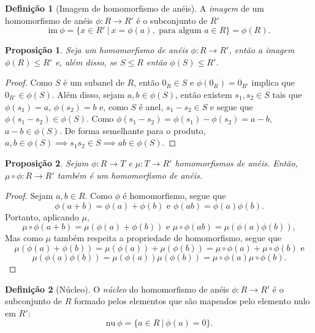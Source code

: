 \documentclass[a4paper,12pt]{report}
\theoremstyle{plain}
\newtheorem{proposicao}{Proposição}[section]
\theoremstyle{definition}
\newtheorem{definicao}{Definição}[section]
\begin{document}
\begin{definicao}[Imagem de homomorfismo de anéis]
	A \emph{imagem} de um homomorfismo de anéis
	\(\phi: R\longrightarrow R'\) é o subconjunto de \(R'\)	\[\text{im}\ \phi = \{x\in R' \ |\ x = \phi(a), \text{ para algum } a\in R\} = \phi(R).\]
\end{definicao}

\begin{proposicao}
	Seja um homomorfismo de anéis $\phi: R \longrightarrow R'$, então a imagem $\phi(R) \leq R'$ e, além disso, se $S\leq R$ então $\phi(S) \leq R'$.
\end{proposicao}

\begin{proof}
	Como $S$ é um subanel de $R$, então $0_R\in S$ e $\phi(0_R) = 0_{R'}$ implica que $0_{R'} \in \phi(S)$. Além disso, sejam $a,b\in \phi(S)$, então existem $s_1,s_2 \in S$ tais que $\phi(s_1) = a$, $\phi(s_2) = b$ e, como $S$ é anel, $s_1 - s_2 \in S$ e segue que $\phi(s_1 - s_2) \in \phi(S)$. Como $\phi(s_1 - s_2) = \phi(s_1) - \phi(s_2) = a - b$, $a-b\in \phi(S)$. De forma semelhante para o produto, $a,b \in \phi(S) \implies s_1s_2 \in S \implies ab \in \phi(S)$.
\end{proof}

\begin{proposicao}
	Sejam $\phi: R \longrightarrow T$ e $\mu: T\longrightarrow R'$ homomorfismos de anéis. Então, $\mu\circ\phi: R\longrightarrow R'$ também é um homomorfismo de anéis.	
\end{proposicao}
\begin{proof}
	Sejam $a,b \in R$. Como $\phi$ é homomorfismo, segue que $$\phi(a+b) = \phi(a) + \phi(b) \text{ e } \phi(ab) = \phi(a)\phi(b).$$
	Portanto, aplicando $\mu$,
	$$\mu\circ\phi(a+b) = \mu(\phi(a) + \phi(b)) \text{ e } \mu\circ\phi(ab) = \mu(\phi(a)\phi(b)),$$
	Mas como $\mu$ também respeita a propriedade de homomorfismo, segue que
	$$\mu(\phi(a) + \phi(b)) = \mu(\phi(a)) + \mu(\phi(b)) = \mu\circ\phi(a) + \mu\circ\phi(b)\text{ e}$$
	$$\mu(\phi(a)\phi(b)) = \mu(\phi(a))\mu(\phi(b)) = \mu\circ\phi(a)\mu\circ\phi(b).$$
\end{proof}

\begin{definicao}[Núcleo]
	O \emph{núcleo} do homomorfismo de anéis $\phi: R \longrightarrow R'$ é o subconjunto de $R$ formado pelos elementos que são mapeados pelo elemento nulo em
	$R'$: $$\text{nu} \ \phi = \{a \in R \ | \ \phi(a) = 0\}.$$
\end{definicao}
\end{document}
